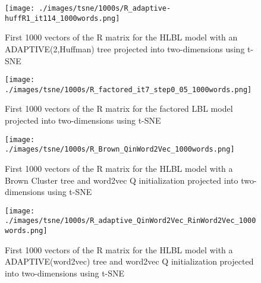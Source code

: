 \begin{figure}[h]
\texttt{[image: ./images/tsne/1000s/R\_adaptive-huffR1\_it114\_1000words.png]} 
\centering
\caption{First 1000 vectors of the R matrix for the HLBL model with an ADAPTIVE(2,Huffman) tree projected into two-dimensions using t-SNE}
\end{figure}

\begin{figure}[h]
\texttt{[image: ./images/tsne/1000s/R\_factored\_it7\_step0\_05\_1000words.png]} 
\centering
\caption{First 1000 vectors of the R matrix for the factored LBL model projected into two-dimensions using t-SNE}
\end{figure}

\begin{figure}[h]
\texttt{[image: ./images/tsne/1000s/R\_Brown\_QinWord2Vec\_1000words.png]} 
\centering
\caption{First 1000 vectors of the R matrix for the HLBL model with a Brown Cluster tree and word2vec Q initialization projected into two-dimensions using t-SNE}
\end{figure}

\begin{figure}[h]
\texttt{[image: ./images/tsne/1000s/R\_adaptive\_QinWord2Vec\_RinWord2Vec\_1000words.png]} 
\centering
\caption{First 1000 vectors of the R matrix for the HLBL model with a ADAPTIVE(word2vec) tree and word2vec Q initialization projected into two-dimensions using t-SNE}
\end{figure}
